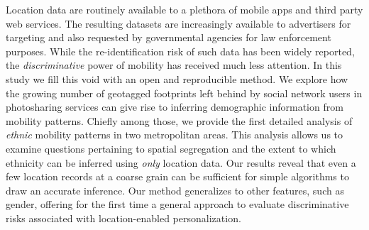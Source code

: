 Location data are routinely available to a plethora of mobile apps and third party web services. The resulting datasets are increasingly available to advertisers for targeting and also requested by governmental agencies for law enforcement purposes. While the re-identification risk of such data has been widely reported, the \emph{discriminative} power of mobility has received much less attention. In this study we fill this void with an open and reproducible method. We explore how the growing number of geotagged footprints left behind by social network users in photosharing services can give rise to inferring demographic information from mobility patterns. Chiefly among those, we provide the first detailed analysis of \emph{ethnic} mobility patterns in two metropolitan areas. This analysis allows us to examine questions pertaining to spatial segregation and the extent to which ethnicity can be inferred using \emph{only} location data. Our results reveal that even a few location records at a coarse grain can be sufficient for simple algorithms to draw an accurate inference. Our method generalizes to other features, such as gender, offering for the first time a general approach to evaluate discriminative risks associated with location-enabled personalization.
